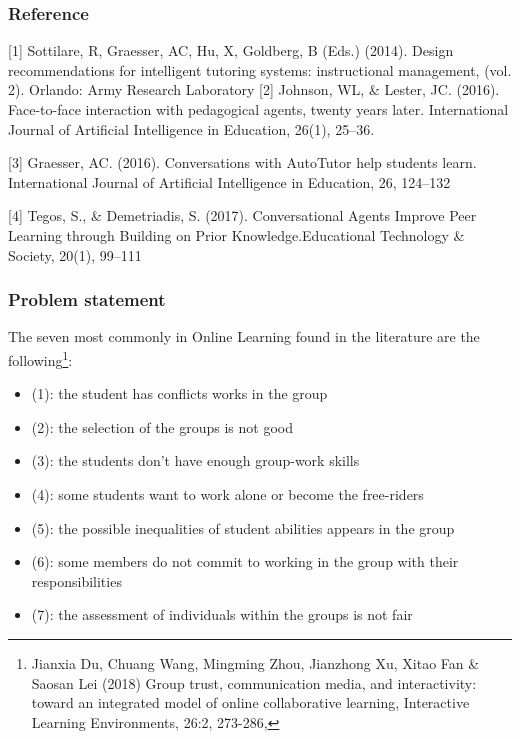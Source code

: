 \documentclass{beamer}
\begin{document}
\begin{frame}
\frametitle{Reference}
\begin{thebibliography}{01}
{\scriptsize 	{}	[1] Sottilare, R, Graesser, AC, Hu, X, Goldberg, B (Eds.) (2014). Design recommendations
for intelligent tutoring systems: instructional management, (vol. 2). Orlando:
Army Research Laboratory
 [2] 	Johnson, WL, \& Lester, JC. (2016). Face-to-face interaction with pedagogical
agents, twenty years later. International Journal of Artificial Intelligence in
Education, 26(1), 25–36.
		
 [3]	Graesser, AC. (2016). Conversations with AutoTutor help students learn.
International Journal of Artificial Intelligence in Education, 26, 124–132	

  [4] Tegos,  S.,  \&  Demetriadis,  S.  (2017). Conversational  Agents  Improve Peer  Learning  through  Building  on Prior  Knowledge.Educational Technology \& Society, 20(1), 99–111}
\end{thebibliography}
\end{frame}
\begin{frame}
\frametitle{Problem statement}
The seven most commonly in Online Learning found in the literature are the following\footnote{{\tiny Jianxia Du, Chuang Wang, Mingming Zhou, Jianzhong Xu, Xitao Fan \& Saosan Lei (2018) Group trust, communication media, and interactivity: toward an integrated model of online collaborative learning, Interactive Learning Environments, 26:2, 273-286,}
}:
{\footnotesize \begin{itemize}
	\item (1): the student has conflicts works in the group
	\item (2): the selection of the groups is not good
	\item (3): the students don't have enough group-work skills
	\item (4):  some students want to work alone or become the free-riders
	\item (5):  the possible inequalities of student abilities appears in the group
	\item (6):  some members do not commit to working in the group with their responsibilities
	\item (7): the assessment of individuals within the groups is not fair
\end{itemize}}


\end{frame}
\end{document}
